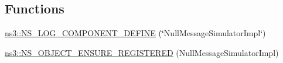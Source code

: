 \subsection*{Functions}
\begin{DoxyCompactItemize}
\item 
\hyperlink{namespacens3_ad58d7f2bc78429dd2530927d82f52963}{ns3\+::\+N\+S\+\_\+\+L\+O\+G\+\_\+\+C\+O\+M\+P\+O\+N\+E\+N\+T\+\_\+\+D\+E\+F\+I\+NE} (\char`\"{}Null\+Message\+Simulator\+Impl\char`\"{})
\item 
\hyperlink{namespacens3_a124d1b4b8a5fb6ec4616477a0b1a6abd}{ns3\+::\+N\+S\+\_\+\+O\+B\+J\+E\+C\+T\+\_\+\+E\+N\+S\+U\+R\+E\+\_\+\+R\+E\+G\+I\+S\+T\+E\+R\+ED} (Null\+Message\+Simulator\+Impl)
\end{DoxyCompactItemize}
